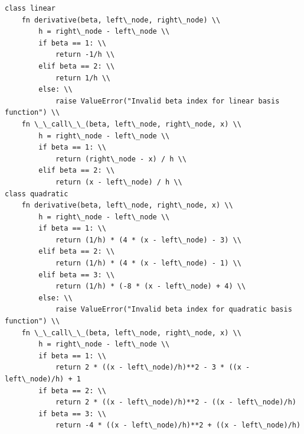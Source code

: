 \documentclass[12pt, oneside]{book}
\begin{document}
\begin{lstlisting}
class linear
    fn derivative(beta, left\_node, right\_node) \\
        h = right\_node - left\_node \\
        if beta == 1: \\
            return -1/h \\
        elif beta == 2: \\
            return 1/h \\
        else: \\
            raise ValueError("Invalid beta index for linear basis function") \\
    fn \_\_call\_\_(beta, left\_node, right\_node, x) \\
        h = right\_node - left\_node \\
        if beta == 1: \\
            return (right\_node - x) / h \\
        elif beta == 2: \\
            return (x - left\_node) / h \\
class quadratic
    fn derivative(beta, left\_node, right\_node, x) \\
        h = right\_node - left\_node \\
        if beta == 1: \\
            return (1/h) * (4 * (x - left\_node) - 3) \\
        elif beta == 2: \\
            return (1/h) * (4 * (x - left\_node) - 1) \\
        elif beta == 3: \\
            return (1/h) * (-8 * (x - left\_node) + 4) \\
        else: \\
            raise ValueError("Invalid beta index for quadratic basis function") \\
    fn \_\_call\_\_(beta, left\_node, right\_node, x) \\
        h = right\_node - left\_node \\
        if beta == 1: \\
            return 2 * ((x - left\_node)/h)**2 - 3 * ((x - left\_node)/h) + 1
        if beta == 2: \\
            return 2 * ((x - left\_node)/h)**2 - ((x - left\_node)/h)
        if beta == 3: \\
            return -4 * ((x - left\_node)/h)**2 + ((x - left\_node)/h)
\end{lstlisting}
\end{document}
